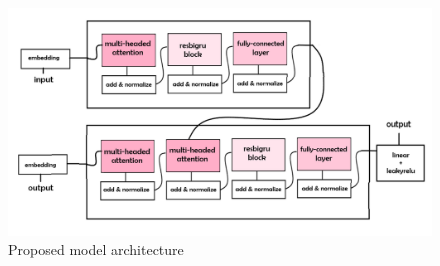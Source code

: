 \documentclass[a4paper, noexaminfo]{sapthesis}
\begin{document}
  \begin{figure}[h!]
    \centering
    \includegraphics[width=1\linewidth]{images/bigru_light.png}
    \caption{Proposed model architecture}
    \end{figure}
\end{document}
